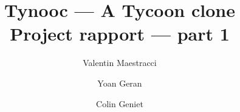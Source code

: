 \documentclass{article}
\begin{document}
\title{Tynooc --- A Tycoon clone \\ \large{Project rapport --- part 1}}
\author{Valentin Maestracci \and Yoan Geran \and Colin Geniet}
\maketitle

\tableofcontents
\end{document}
